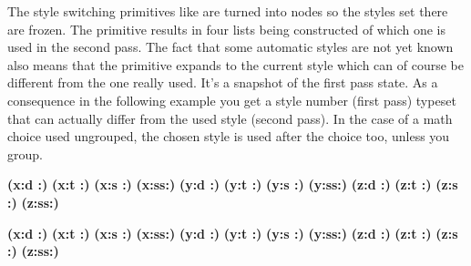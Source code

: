 The style switching primitives like \type {\textstyle} are turned into nodes so the
styles set there are frozen. The \type {\mathchoice} primitive results in four
lists being constructed of which one is used in the second pass. The fact that
some automatic styles are not yet known also means that the \type {\mathstyle}
primitive expands to the current style which can of course be different from the
one really used. It's a snapshot of the first pass state. As a consequence in the
following example you get a style number (first pass) typeset that can actually
differ from the used style (second pass). In the case of a math choice used
ungrouped, the chosen style is used after the choice too, unless you group.

\quad
    \bgroup
    \mathchoice
        {\bf \scriptstyle       (x:d :\number\mathstyle)}
        {\bf \scriptscriptstyle (x:t :\number\mathstyle)}
        {\bf \scriptscriptstyle (x:s :\number\mathstyle)}
        {\bf \scriptscriptstyle (x:ss:\number\mathstyle)}
    \egroup
    \quad
    \mathchoice
        {\bf \scriptstyle       (y:d :\number\mathstyle)}
        {\bf \scriptscriptstyle (y:t :\number\mathstyle)}
        {\bf \scriptscriptstyle (y:s :\number\mathstyle)}
        {\bf \scriptscriptstyle (y:ss:\number\mathstyle)}
    \quad
    \bgroup
    \mathchoice
        {\bf \scriptstyle       (z:d :\number\mathstyle)}
        {\bf \scriptscriptstyle (z:t :\number\mathstyle)}
        {\bf \scriptscriptstyle (z:s :\number\mathstyle)}
        {\bf \scriptscriptstyle (z:ss:\number\mathstyle)}
    \egroup
\stopbuffer

\quad
    \begingroup
    \mathchoice
        {\bf \scriptstyle       (x:d :\number\mathstyle)}
        {\bf \scriptscriptstyle (x:t :\number\mathstyle)}
        {\bf \scriptscriptstyle (x:s :\number\mathstyle)}
        {\bf \scriptscriptstyle (x:ss:\number\mathstyle)}
    \endgroup
    \quad
    \mathchoice
        {\bf \scriptstyle       (y:d :\number\mathstyle)}
        {\bf \scriptscriptstyle (y:t :\number\mathstyle)}
        {\bf \scriptscriptstyle (y:s :\number\mathstyle)}
        {\bf \scriptscriptstyle (y:ss:\number\mathstyle)}
    \quad
    \begingroup
    \mathchoice
        {\bf \scriptstyle       (z:d :\number\mathstyle)}
        {\bf \scriptscriptstyle (z:t :\number\mathstyle)}
        {\bf \scriptscriptstyle (z:s :\number\mathstyle)}
        {\bf \scriptscriptstyle (z:ss:\number\mathstyle)}
    \endgroup
\stopbuffer

